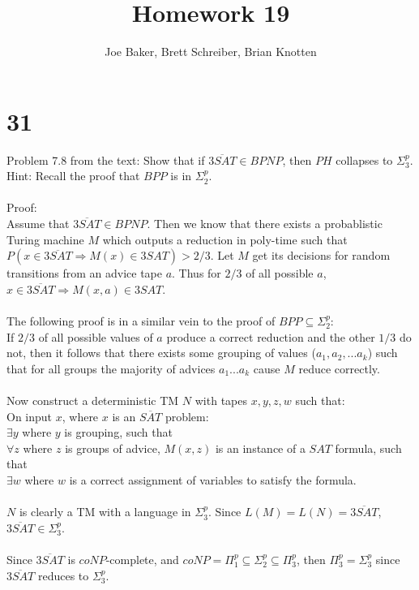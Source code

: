 \documentclass[letterpaper,notitlepage,twoside]{article}
\renewcommand{\implies}{\Rightarrow} %
\begin{document}
\title{Homework 19}
\author{Joe Baker, Brett Schreiber, Brian Knotten}
\maketitle

\section*{31}
Problem 7.8 from the text: Show that if $\overline{3SAT} \in BPNP$, then $PH$ collapses to $\Sigma_3^p$.
\\
Hint: Recall the proof that $BPP$ is in $\Sigma_2^p$.
\\\\
Proof:
\\
Assume that $\overline{3SAT} \in BPNP$. Then we know that there exists a probablistic Turing machine $M$ which outputs a reduction in poly-time such that $P(x \in \overline{3SAT} \implies M(x) \in 3SAT) > 2/3$. Let $M$ get its decisions for random transitions from an advice tape $a$. Thus for $2/3$ of all possible $a$, $x \in \overline{3SAT} \implies M(x, a) \in 3SAT$.
\\\\
The following proof is in a similar vein to the proof of $BPP \subseteq \Sigma_2^p$:\\
If $2/3$ of all possible values of $a$ produce a correct reduction and the other $1/3$ do not, then it follows that there exists some grouping of values ($a_1, a_2, ... a_k$) such that for all groups the majority of advices $a_1...a_k$ cause $M$ reduce correctly.
\\\\
Now construct a deterministic TM $N$ with tapes $x, y, z, w$ such that:\\
On input $x$, where $x$ is an $\overline{SAT}$ problem: \\
$\exists y$ where $y$ is grouping, such that \\
$\forall z$ where $z$ is groups of advice, $M(x, z)$ is an instance of a $SAT$ formula, such that \\
$\exists w$ where $w$ is a correct assignment of variables to satisfy the formula.
\\\\
$N$ is clearly a TM with a language in $\Sigma_3^p$. Since $L(M) = L(N) = \overline{3SAT}$, $\overline{3SAT} \in \Sigma_3^p$.
\\\\
Since $\overline{3SAT}$ is $coNP$-complete, and $coNP = \Pi_1^p \subseteq \Sigma_2^p \subseteq \Pi_3^p$, then $\Pi_3^p = \Sigma_3^p$ since $\overline{3SAT}$ reduces to $\Sigma_3^p$.
\end{document}
